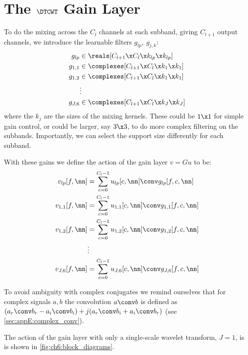\section{The $\DTCWT$ Gain Layer}\label{sec:ch6:gainlayer}
To do the mixing across the $C_l$ channels at each subband, giving $C_{l+1}$
output channels, we introduce the learnable filters $g_{lp},\ g_{j,k}$:
%
\begin{align}
  g_{lp} &\in \reals[C_{l+1}\x C_l\x k_{lp}\x k_{lp}] \label{eq:ch6:glp} \\
  g_{1,1} &\in \complexes[C_{l+1}\x C_l\x k_1\x k_1] \\
  g_{1,2} &\in \complexes[C_{l+1}\x C_l\x k_1\x k_1] \\
      & \vdots \nonumber \\
  g_{J,6} &\in \complexes[C_{l+1}\x C_l\x k_J\x k_J]  \label{eq:ch6:gj6}
\end{align}
%
where the $k_j$ are the sizes of the mixing kernels. These could be $1\x 1$ for
simple gain control, or could be larger, say $3\x 3$, to do more complex
filtering on the subbands. Importantly, we can select the support size
differently for each subband.

With these gains we define the action of the gain layer $v = Gu$ to be:
\begin{align} 
  v_{lp}[f, \nn] &=  \sum_{c=0}^{C_l-1} u_{lp}[c, \nn] \conv g_{lp}[f, c, \nn] \label{eq:ch6:gain1} \\
  v_{1,1}[f, \nn] &=  \sum_{c=0}^{C_l-1} u_{1,1}[c, \nn] \conv g_{1,1}[f, c, \nn] \\
  v_{1,2}[f, \nn] &=  \sum_{c=0}^{C_l-1} u_{1,2}[c, \nn] \conv g_{1,2}[f, c, \nn] \\
                  & \vdots \nonumber \\
  v_{J,6}[f, \nn] &=  \sum_{c=0}^{C_l-1} u_{J,6}[c, \nn] \conv g_{J,6}[f, c, \nn] \label{eq:ch6:gain2}
\end{align}

To avoid ambiguity with complex conjugates we remind ourselves that for complex
signals $a, b$ the convolution $a \conv b$ is defined as $(a_r \conv b_r - a_i
\conv b_i) + j(a_r \conv b_i + a_i \conv b_r)$ (see
\autoref{sec:appE:complex_conv}).

The action of the gain layer with only a single-scale wavelet transform, $J=1$, is is shown in
\autoref{fig:ch6:block_diagrams}.

